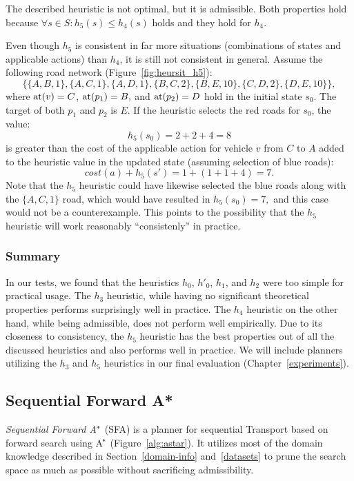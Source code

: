 The described heuristic is not optimal, but it is admissible.
Both properties hold because $\forall s \in S : h_5(s) \leq h_4(s)$ holds
and they hold for $h_4$.

Even though $h_5$ is consistent in far more situations (combinations of states and applicable actions) than $h_4$, it is still not consistent in general.
Assume the following road network (Figure~\ref{fig:heursit_h5}):
$$\{\{A, B, 1\}, \{A, C, 1\}, \{A, D, 1\}, \{B, C, 2\}, \{B, E, 10\}, \{C, D, 2\}, \{D, E, 10\}\},$$
where $\textrm{at}(v) = C$, $\textrm{at}(p_1) = B,$ and $\textrm{at}(p_2) = D$
hold in the initial state $s_0$.
The target of both $p_1$ and $p_2$ is $E$.
If the heuristic selects the red roads for $s_0$, the value:
$$h_5(s_0) = 2+2+4 = 8$$ is greater than the cost
of the applicable \drive{} action for vehicle $v$ from $C$ to $A$
added to the heuristic value in the updated state (assuming selection of blue roads):
$$cost(a) + h_5(s') = 1 + (1+1+4) = 7.$$
Note that the $h_5$ heuristic could have likewise selected the blue roads along
with the $\{A, C, 1\}$ road, which would have resulted in $h_5(s_0) = 7,$
and this case would not be a counterexample. This points to the possibility that the $h_5$ heuristic will work reasonably ``consistenly'' in practice.

\subsubsection{Summary}

In our tests, we found that
the heuristics $h_0$, $h'_0$, $h_1$, and $h_2$
were too simple for practical usage.
The $h_3$ heuristic, while having no significant
theoretical properties performs surprisingly well in practice.
The $h_4$ heuristic on the other hand, while being admissible, does not
perform well empirically.
Due to its closeness to consistency, the $h_5$ heuristic has the best properties out of all the discussed heuristics and also
performs well in practice.
We will include planners utilizing the $h_3$ and $h_5$ heuristics
in our final evaluation (Chapter~\ref{experiments}).








\subsection{Sequential Forward A*}\label{sfa}

\textit{Sequential Forward A$^{\kern-.05em*}$} (SFA) is a planner for sequential Transport based on forward search using A$^{\kern-.15em*}$ (Figure~\ref{alg:astar}).
It utilizes most of the domain knowledge described
in Section~\ref{domain-info} and~\ref{datasets}
to prune the search space as much as possible
without sacrificing admissibility.

